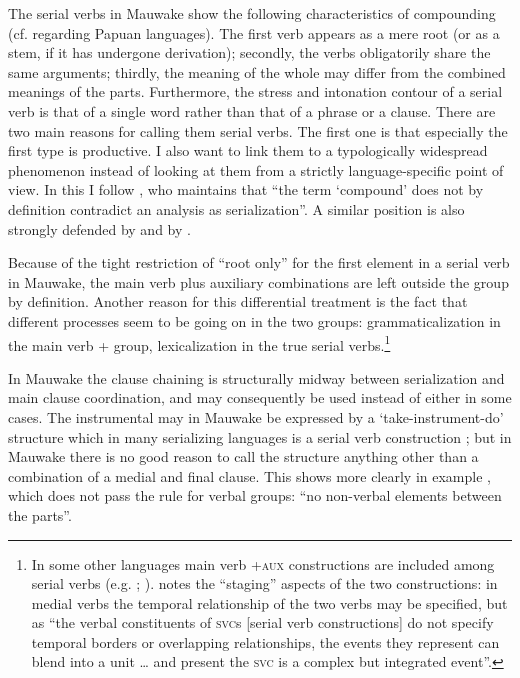 The serial verbs in Mauwake show the following characteristics of compounding (cf. \citealt[69]{James1983} regarding Papuan languages). The first verb appears as a mere root (or as a stem, if it has undergone derivation); secondly, the verbs obligatorily share the same arguments; thirdly, the meaning of the whole may differ from the combined meanings of the parts. Furthermore, the stress and intonation contour of a serial verb is that of a single word rather than that of a phrase or a clause. There are two main reasons for calling them serial verbs. The first one is that especially the first type is productive. I also want to link them to a typologically widespread phenomenon instead of looking at them from a strictly language-specific point of view. In this I follow \citet[101]{Margetts1999}, who maintains that ``{the term `compound' does not by definition contradict an analysis as serialization}''. A similar position is also strongly defended by \citet[16]{Crowley2002} and by \citet[17]{Givon1991}.

Because of the tight restriction of ``root only'' for the first element in a serial verb in Mauwake, the main verb plus auxiliary combinations are left outside the group by definition. Another reason for this differential treatment is the fact that different processes seem to be going on in the two groups: grammaticalization in the main verb +  group, lexicalization in the true serial verbs.\footnote{In some other languages main verb +\textsc{aux} constructions are included among serial verbs (e.g. \citealt[29]{James1983}; \citealt[178]{Crowley2002}). \citet[174]{Farr1999} notes the ``staging'' aspects of the two constructions: in medial verbs the temporal relationship of the two verbs may be specified, but as ``the verbal constituents of \textsc{svc}s [serial verb constructions] do not specify temporal borders or overlapping relationships, the events they represent can blend into a unit {\dots} and present the \textsc{svc} is a complex but integrated event''.} 

In Mauwake the clause chaining is structurally midway between serialization and main clause coordination, and may consequently be used instead of either in some cases. The instrumental may in Mauwake be expressed by a `take-instrument-do' structure  which in many serializing languages is a serial verb construction \citep[162--74]{Sebba1987}; but in Mauwake there is no good reason to call the structure anything other than a combination of a medial and final clause. This shows more clearly in example , which does not pass the rule for verbal groups: ``no non-verbal elements between the parts''. 

